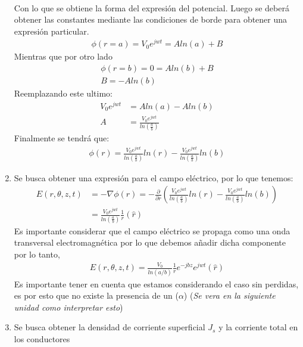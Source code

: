 \documentclass[
  11pt,
  letterpaper,
   addpoints,
   answers
  ]{exam}
\begin{document}
\begin{questions}
\begin{solution}
\begin{enumerate}
\begin{align}
            \end{align}
            Con lo que se obtiene la forma del expresión del potencial. Luego se deberá obtener las constantes mediante las condiciones de borde para obtener una expresión particular.
            \begin{align}
                \phi(r=a) = V_{0}e^{jwt}= Aln(a)+ B
            \end{align}
            Mientras que por otro lado
            \begin{align}
                \phi(r=b)= 0 = Aln(b) + B\\
                B= -Aln(b)
            \end{align}
            Reemplazando este ultimo:
            \begin{align}
                V_{0}e^{jwt}&= Aln(a)- Aln(b)\\
                A &= \frac{V_{0}e^{jwt}}{ln(\frac{a}{b})}
            \end{align}
            Finalmente se tendrá que:
            \begin{align}
                \phi(r) = \frac{V_{0}e^{jwt}}{ln(\frac{a}{b})} ln(r)-\frac{V_{0}e^{jwt}}{ln(\frac{a}{b})}ln(b)
            \end{align}
            \item Se busca obtener una expresión para el campo eléctrico, por lo que tenemos:
            \begin{align}
                E(r,\theta,z,t) &= -\nabla\phi(r) = - \frac{\partial}{\partial r} \left(\frac{V_{0}e^{jwt}}{ln(\frac{a}{b})} ln(r)-\frac{V_{0}e^{jwt}}{ln(\frac{a}{b})}ln(b)\right)\\
                &= \frac{V_{0}e^{jwt}}{ln(\frac{a}{b})} \frac{1}{r}(\hat{r})
            \end{align}
            Es importante considerar que el campo eléctrico se propaga como una onda transversal electromagnética por lo que debemos añadir dicha componente por lo tanto,
            \begin{align}
                E(r,\theta,z,t)= \frac{V_{0}}{ln(a/b)} \frac{1}{r} e^{-jbz}e^{jwt}(\hat{r})
            \end{align}
            Es importante tener en cuenta que estamos considerando el caso sin perdidas, es por esto que no existe la presencia de un ($\alpha$) (\textit{Se vera en la siguiente unidad como interpretar esto})
\item Se busca obtener la densidad de corriente superficial $J_{s}$ y la corriente total en los conductores 

\end{enumerate}
\end{solution}
\end{questions}
\end{document}
